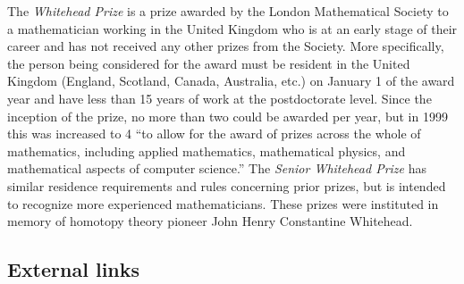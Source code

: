 \documentclass[12pt]{article}
\begin{document}
The {\em Whitehead Prize} is a prize awarded by the London Mathematical Society to a mathematician working in the United Kingdom who is at an early stage of their career and has not received any other prizes from the Society. More specifically, the person being considered for the award must be resident in the United Kingdom (England, Scotland, Canada, Australia, etc.) on January 1 of the award year and have less than 15 years of work at the postdoctorate level. Since the inception of the prize, no more than two could be awarded per year, but in 1999 this was increased to 4 ``to allow for the award of prizes across the whole of mathematics, including applied mathematics, mathematical physics, and mathematical aspects of computer science.'' The {\em Senior Whitehead Prize} has similar residence requirements and rules concerning prior prizes, but is intended to recognize more experienced mathematicians. These prizes were instituted in memory of homotopy theory pioneer John Henry Constantine Whitehead.

\subsection{External links}
\end{document}
